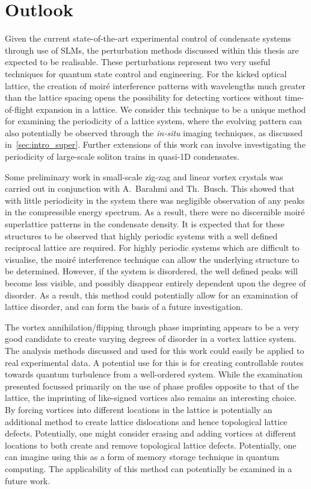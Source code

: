 \section{Outlook}
Given the current state-of-the-art experimental control of condensate systems through use of SLMs, the perturbation methods discussed within this thesis are expected to be realisable. These perturbations represent two very useful techniques for quantum state control and engineering. For the kicked optical lattice, the creation of moir\'e interference patterns with wavelengths much greater than the lattice spacing opens the possibility for detecting vortices without time-of-flight expansion in a lattice. We consider this technique to be a unique method for examining the periodicity of a lattice system, where the evolving pattern can also potentially be observed through the \textit{in-situ} imaging techniques, as discussed in~\ref{sec:intro_super}. Further extensions of this work can involve investigating the periodicity of large-scale soliton trains in quasi-1D condensates.

Some preliminary work in small-scale zig-zag and linear vortex crystals was carried out in conjunction with A.~Barahmi and Th.~Busch. This showed that with little periodicity in the system there was negligible observation of any peaks in the compressible energy spectrum. As a result, there were no discernible moir\'e superlattice patterns in the condensate density. It is expected that for these structures to be observed that highly periodic systems with a well defined reciprocal lattice are required. For highly periodic systems which are difficult to visualise, the moir\'e interference technique can allow the underlying structure to be determined. However, if the system is disordered, the well defined peaks will become less visible, and possibly disappear entirely dependent upon the degree of disorder. As a result, this method could potentially allow for an examination of lattice disorder, and can form the basis of a future investigation.

The vortex annihilation/flipping through phase imprinting appears to be a very good candidate to create varying degrees of disorder in a vortex lattice system. The analysis methods discussed and used for this work could easily be applied to real experimental data. A potential use for this is for creating controllable routes towards quantum turbulence from a well-ordered system. While the examination presented focussed primarily on the use of phase profiles opposite to that of the lattice, the imprinting of like-signed vortices also remains an interesting choice. By forcing vortices into different locations in the lattice is potentially an additional method to create lattice dislocations and hence topological lattice defects. Potentially, one might consider erasing and adding vortices at different locations to both create and remove topological lattice defects. Potentially, one can imagine using this as a form of memory storage technique in quantum computing. The applicability of this method can potentially be examined in a future work.

